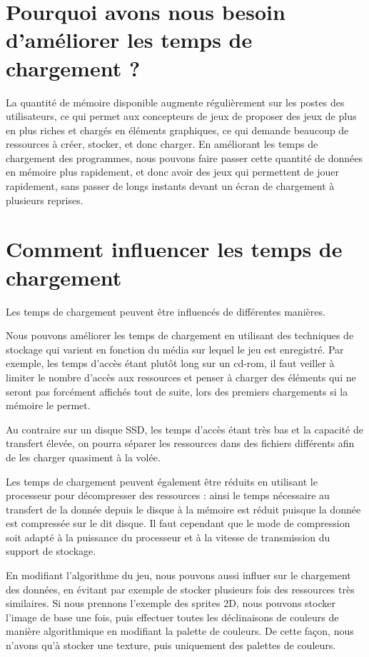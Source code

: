 \documentclass[a4paper, 11pt]{article} %
\begin{document}
\section*{Pourquoi avons nous besoin d'améliorer les temps de chargement ?}
La quantité de mémoire disponible augmente régulièrement sur les postes des utilisateurs, ce qui permet aux concepteurs de jeux de proposer des jeux de plus en plus riches et chargés en éléments graphiques, ce qui demande beaucoup de ressources à créer, stocker, et donc charger. En améliorant les temps de chargement des programmes, nous pouvons faire passer cette quantité de données en mémoire plus rapidement, et donc avoir des jeux qui permettent de jouer rapidement, sans passer de longs instants devant un écran de chargement à plusieurs reprises.

\section*{Comment influencer les temps de chargement}
Les temps de chargement peuvent être influencés de différentes manières.

Nous pouvons améliorer les temps de chargement en utilisant des techniques de stockage qui varient en fonction du média sur lequel le jeu est enregistré. Par exemple, les temps d'accès étant plutôt long sur un cd-rom, il faut veiller à limiter le nombre d'accès aux ressources et penser à charger des éléments qui ne seront pas forcément affichés tout de suite, lors des premiers chargements si la mémoire le permet.

Au contraire sur un disque SSD, les temps d'accès étant très bas et la capacité de transfert élevée, on pourra séparer les ressources dans des fichiers différents afin de les charger quasiment à la volée.

Les temps de chargement peuvent également être réduits en utilisant le processeur pour décompresser des ressources : ainsi le temps nécessaire au transfert de la donnée depuis le disque à la mémoire est réduit puisque la donnée est compressée sur le dit disque. Il faut cependant que le mode de compression soit adapté à la puissance du processeur et à la vitesse de transmission du support de stockage.

\newpage
En modifiant l'algorithme du jeu, nous pouvons aussi influer sur le chargement des données, en évitant par exemple de stocker plusieurs fois des ressources très similaires. Si nous prennons l'exemple des sprites 2D, nous pouvons stocker l'image de base une fois, puis effectuer toutes les déclinaisons de couleurs de manière algorithmique en modifiant la palette de couleurs. De cette façon, nous n'avons qu'à stocker une texture, puis uniquement des palettes de couleurs.
\end{document}
